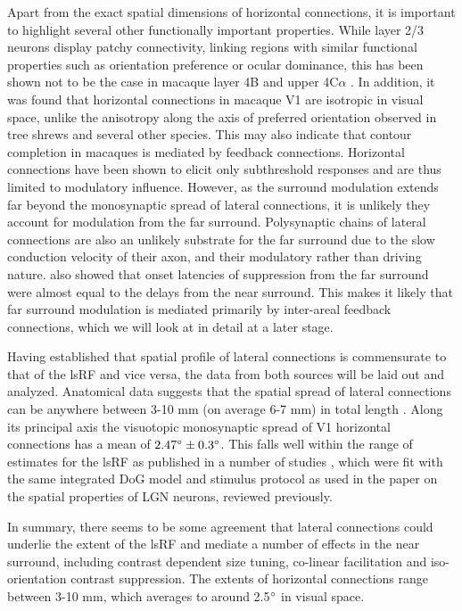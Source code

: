 Apart from the exact spatial dimensions of horizontal connections, it
is important to highlight several other functionally important
properties. While layer 2/3 neurons display patchy connectivity,
linking regions with similar functional properties such as orientation
preference or ocular dominance, this has been shown not to be the case
in macaque layer 4B and upper 4C$\alpha$ \citep{Angelucci2002}. In
addition, it was found that horizontal connections in macaque V1 are
isotropic in visual space, unlike the anisotropy along the axis of
preferred orientation observed in tree shrews \citep{Bosking1997} and
several other species. This may also indicate that contour completion
in macaques is mediated by feedback connections. Horizontal
connections have been shown to elicit only subthreshold responses
\citep{Hirsch1991} and are thus limited to modulatory
influence. However, as the surround modulation extends far beyond the
monosynaptic spread of lateral connections, it is unlikely they
account for modulation from the far surround. Polysynaptic chains of
lateral connections are also an unlikely substrate for the far
surround due to the slow conduction velocity of their axon, and their
modulatory rather than driving nature. \cite{Bair2003} also showed
that onset latencies of suppression from the far surround were almost
equal to the delays from the near surround. This makes it likely that
far surround modulation is mediated primarily by inter-areal feedback
connections, which we will look at in detail at a later stage.

Having established that spatial profile of lateral connections is
commensurate to that of the lsRF and vice versa, the data from both
sources will be laid out and analyzed. Anatomical data suggests that
the spatial spread of lateral connections can be anywhere between 3-10
mm (on average 6-7 mm) in total length \citep{Angelucci2002}. Along
its principal axis the visuotopic monosynaptic spread of V1 horizontal
connections has a mean of $2.47\degree \pm 0.3\degree$. This falls
well within the range of estimates for the lsRF as published in a
number of studies \citep{Shushruth2009,Sceniak1999,Sceniak2001}, which
were fit with the same integrated DoG model and stimulus protocol as
used in the \cite{Sceniak2006} paper on the spatial properties of LGN
neurons, reviewed previously.

In summary, there seems to be some agreement that lateral connections
could underlie the extent of the lsRF and mediate a number of effects
in the near surround, including contrast dependent size tuning,
co-linear facilitation and iso-orientation contrast suppression.  The
extents of horizontal connections range between 3-10 mm, which
averages to around 2.5$\degree$ in visual space.

